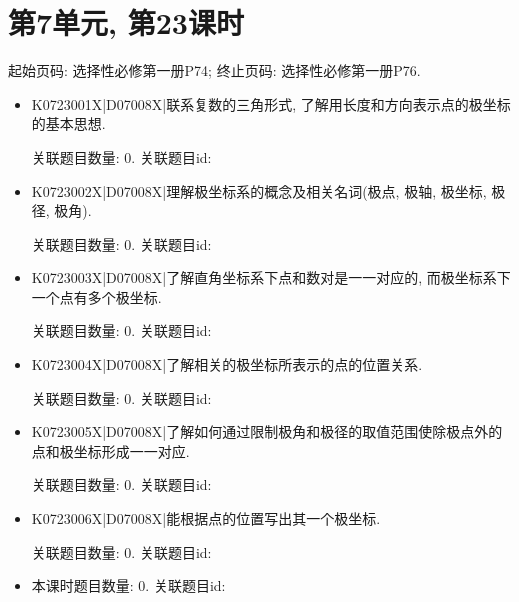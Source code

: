 \section*{第7单元, 第23课时}
起始页码: 选择性必修第一册P74; 终止页码: 选择性必修第一册P76.
\begin{itemize}
\item K0723001X|D07008X|联系复数的三角形式, 了解用长度和方向表示点的极坐标的基本思想.

关联题目数量: 0. 关联题目id: 

\item K0723002X|D07008X|理解极坐标系的概念及相关名词(极点, 极轴, 极坐标, 极径, 极角).

关联题目数量: 0. 关联题目id: 

\item K0723003X|D07008X|了解直角坐标系下点和数对是一一对应的, 而极坐标系下一个点有多个极坐标.

关联题目数量: 0. 关联题目id: 

\item K0723004X|D07008X|了解相关的极坐标所表示的点的位置关系.

关联题目数量: 0. 关联题目id: 

\item K0723005X|D07008X|了解如何通过限制极角和极径的取值范围使除极点外的点和极坐标形成一一对应.

关联题目数量: 0. 关联题目id: 

\item K0723006X|D07008X|能根据点的位置写出其一个极坐标.

关联题目数量: 0. 关联题目id: 

\item 本课时题目数量: 0. 关联题目id: 

\end{itemize}

